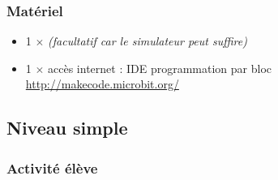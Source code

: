 \subsubsection{Matériel}
\begin{itemize}
    \item 1 $\times$ \matosMb \emph{(facultatif car le simulateur peut suffire)}
    \item 1 $\times$ accès internet : IDE programmation par bloc \url{http://makecode.microbit.org/}
\end{itemize}



%
%
\newpage
\subsection{Niveau simple}
\subsubsection{Activité élève}




